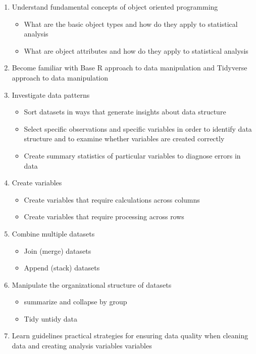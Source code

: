 \documentclass[11pt,]{article}
\providecommand{\tightlist}{%
  \setlength{\itemsep}{0pt}\setlength{\parskip}{0pt}}
\begin{document}
\begin{enumerate}
\def\labelenumi{\arabic{enumi}.}
\tightlist
\item
  Understand fundamental concepts of object oriented programming

  \begin{itemize}
  \tightlist
  \item
    What are the basic object types and how do they apply to statistical
    analysis
  \item
    What are object attributes and how do they apply to statistical
    analysis
  \end{itemize}
\item
  Become familiar with Base R approach to data manipulation and
  Tidyverse approach to data manipulation
\item
  Investigate data patterns

  \begin{itemize}
  \tightlist
  \item
    Sort datasets in ways that generate insights about data structure
  \item
    Select specific observations and specific variables in order to
    identify data structure and to examine whether variables are created
    correctly
  \item
    Create summary statistics of particular variables to diagnose errors
    in data
  \end{itemize}
\item
  Create variables

  \begin{itemize}
  \tightlist
  \item
    Create variables that require calculations across columns
  \item
    Create variables that require processing across rows
  \end{itemize}
\item
  Combine multiple datasets

  \begin{itemize}
  \tightlist
  \item
    Join (merge) datasets
  \item
    Append (stack) datasets
  \end{itemize}
\item
  Manipulate the organizational structure of datasets

  \begin{itemize}
  \tightlist
  \item
    summarize and collapse by group
  \item
    Tidy untidy data
  \end{itemize}
\item
  Learn guidelines practical strategies for ensuring data quality when
  cleaning data and creating analysis variables variables
\end{enumerate}
\end{document}
